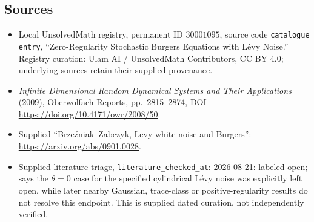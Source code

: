 \documentclass[11pt]{article}
\begin{document}
\subsection{Sources}
\begin{itemize}
\item Local UnsolvedMath registry, permanent ID \(30001095\), source code \texttt{catalogue entry}, ``Zero-Regularity Stochastic Burgers Equations with Lévy Noise.'' Registry curation: Ulam AI / UnsolvedMath Contributors, CC BY 4.0; underlying sources retain their supplied provenance.
\item \emph{Infinite Dimensional Random Dynamical Systems and Their Applications} (2009), Oberwolfach Reports, pp.\ 2815--2874, DOI \url{https://doi.org/10.4171/owr/2008/50}.
\item Supplied ``Brzeźniak--Zabczyk, Levy white noise and Burgers'': \url{https://arxiv.org/abs/0901.0028}.
\item Supplied literature triage, \texttt{literature\_checked\_at}: 2026-08-21: labeled open; says the \(\theta=0\) case for the specified cylindrical Lévy noise was explicitly left open, while later nearby Gaussian, trace-class or positive-regularity results do not resolve this endpoint. This is supplied dated curation, not independently verified.
\end{itemize}
\end{document}

